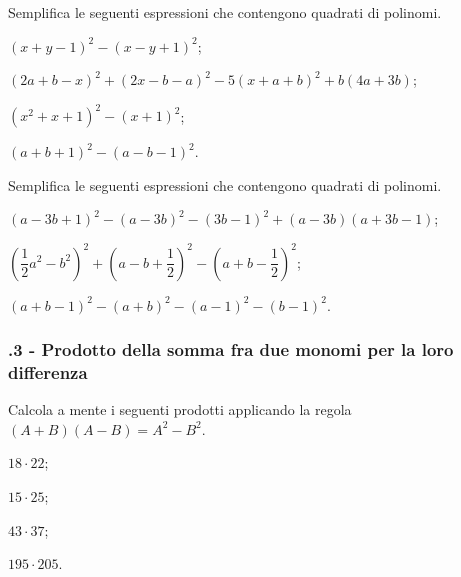 \begin{esercizio}[\Ast]
 \label{ese:11.14}
Semplifica le seguenti espressioni che contengono quadrati di polinomi.

\begin{enumeratea}
 \item $(x+y-1)^{2}-(x-y+1)^{2}$;
\item $(2a+b-x)^{2}+(2x-b-a)^{2}-5(x+a+b)^{2}+b(4a+3b)$;
\item $\left(x^{2}+x+1\right)^{2}-(x+1)^{2}$;
\item $(a+b+1)^{2}-(a-b-1)^{2}$.
\end{enumeratea}
\end{esercizio}

\begin{esercizio}
 \label{ese:11.15}
Semplifica le seguenti espressioni che contengono quadrati di polinomi.

\begin{enumeratea}
 \item $(a-3b+1)^{2}-(a-3b)^{2}-(3b-1)^{2}+(a-3b)(a+3b-1)$;
\item $\left(\dfrac{1}{2}a^{2}-b^{2}\right)^{2}+\left(a-b+\dfrac{1}{2}\right)^{2}-\left(a+b-\dfrac{1}{2}\right)^{2}$;
\item $(a+b-1)^{2}-(a+b)^{2}-(a-1)^{2}-(b-1)^{2}$.
\end{enumeratea}
\end{esercizio}

\subsubsection*{\thechapter.3 - Prodotto della somma fra due monomi per la loro differenza}
\begin{esercizio}
 \label{ese:11.16}
 Calcola a mente i seguenti prodotti applicando la regola $(A+B)(A-B)=A^2-B^2$.
 \begin{multicols}{4}
\begin{enumeratea}
 \item $18\cdot 22$;
 \item $15\cdot 25$;
 \item $43\cdot 37$;
 \item $195\cdot 205$.
\end{enumeratea}
\end{multicols}
\end{esercizio}

